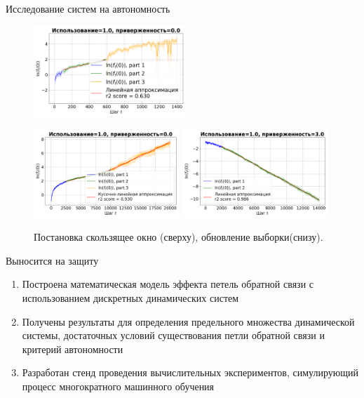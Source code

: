 \documentclass{beamer}
\begin{document}
    \begin{frame}{Исследование систем на автономность}
        \begin{figure}
            \centering
            \includegraphics[width=0.51\textwidth]{fig/aut_sw_synthetic_sgd_model_50_1.0_0.0.png}
            
            \includegraphics[width=0.49\textwidth]{fig/aut_su_synthetic_sgd_model_50_1.0_0.0.png}
            \includegraphics[width=0.49\textwidth]{fig/aut_su_synthetic_sgd_model_50_1.0_3.0.png}

            Постановка скользящее окно (сверху), обновление выборки(снизу).
        \end{figure}
    \end{frame}
\begin{frame}{Выносится на защиту}
    \begin{enumerate}
        \item Построена математическая модель эффекта петель обратной связи с использованием дискретных динамических систем
        \item Получены результаты для определения предельного множества динамической системы, достаточных условий существования петли обратной связи и критерий автономности
        \item Разработан стенд проведения вычислительных экспериментов, симулирующий процесс многократного машинного обучения
    \end{enumerate}
\end{frame}
\end{document}
